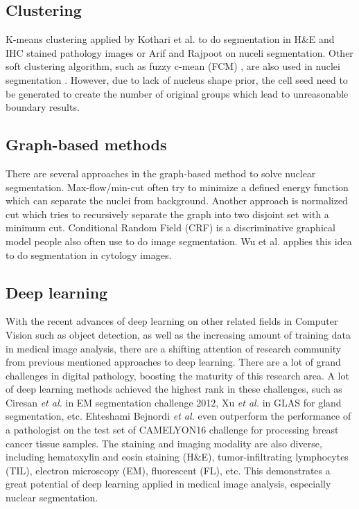 \subsection{Clustering}
K-means clustering \cite{kmean} applied by Kothari et al. \cite{clustering1} to do segmentation in H\&E and IHC stained pathology images or Arif and Rajpoot \cite{clustering2} on nuceli segmentation. Other soft clustering algorithm, such as fuzzy c-mean (FCM) \cite{fuzy}, are also used in nuclei segmentation \cite{parallel_fuzy}. However, due to lack of nucleus shape prior, the cell seed need to be generated to create the number of original groups which lead to unreasonable boundary results. 

\subsection{Graph-based methods}
There are several approaches in the graph-based method to solve nuclear segmentation. Max-flow/min-cut \cite{maxflow} often try to minimize a defined energy function which can separate the nuclei from background. Another approach is normalized cut \cite{normalized_cut} which tries to recursively separate the graph into two disjoint set with a minimum cut. Conditional Random Field (CRF) \cite{crf} is a discriminative graphical model people also often use to do image segmentation. Wu et al. \cite{6157605} applies this idea to do segmentation in cytology images.

\subsection{Deep learning}

With the recent advances of deep learning on other related fields in Computer Vision such as object detection, as well as the increasing amount of training data in medical image analysis, there are a shifting attention of research community from previous mentioned approaches to deep learning. There are a lot of grand challenges in digital pathology, boosting the maturity of this research area. A lot of deep learning methods achieved the highest rank in these challenges, such as Ciresan \textit{et al.} \cite{NIPS2012_4741} in EM segmentation challenge 2012, Xu \textit{et al.} \cite{DBLP:journals/corr/XuLLWLC16} in GLAS for gland segmentation, etc. Ehteshami Bejnordi \textit{et al.} \cite{7243333} even outperform the performance of a pathologist on the test set of CAMELYON16 challenge for processing breast cancer tissue samples. The staining and imaging modality are also diverse, including hematoxylin and eosin staining (H\&E), tumor-infiltrating lymphocytes (TIL), electron microscopy (EM), fluorescent (FL), etc. This demonstrates a great potential of deep learning applied in medical image analysis, especially nuclear segmentation.

